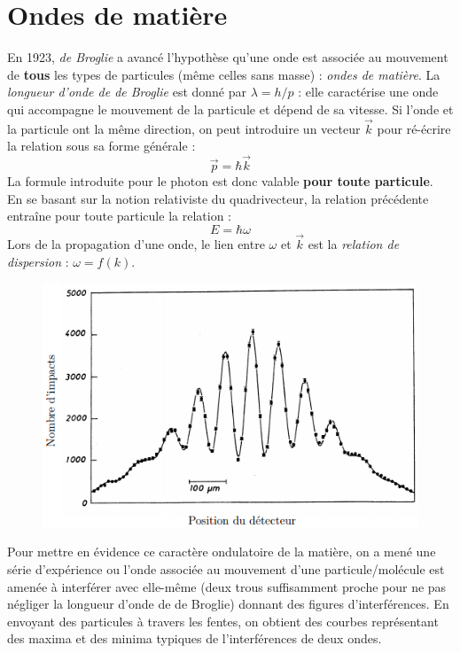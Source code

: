 \documentclass	[11pt, a4paper, openany]{book}
\begin{document}
\section{Ondes de matière}
En 1923, \textit{de Broglie} a avancé l'hypothèse qu'une onde est associée au mouvement de \textbf{tous} les types de particules (même celles sans masse) : \textit{ondes de matière}. La \textit{longueur d'onde de de Broglie} est donné par $\lambda = h/p$ : elle caractérise une onde qui accompagne le mouvement de la particule et dépend de sa vitesse. Si l'onde et la particule ont la même direction, on peut introduire un vecteur $\vec{k}$ pour ré-écrire la relation sous sa forme générale :
\begin{equation}
\vec p = \hbar \vec{k}
\end{equation}
La formule introduite pour le photon est donc valable \textbf{pour toute particule}.\\
En se basant sur la notion relativiste du quadrivecteur, la relation précédente entraîne pour toute particule la relation :
\begin{equation}
E = \hbar\omega
\end{equation}
Lors de la propagation d'une onde, le lien entre $\omega$ et $\vec{k}$ est la \textit{relation de dispersion} : $\omega = f(k)$.\\

\begin{figure}
\includegraphics[scale=0.3]{img/image3.png}
\end{figure}
Pour mettre en évidence ce caractère ondulatoire de la matière, on a mené une série d'expérience ou l'onde associée au mouvement d'une particule/molécule est amenée à interférer avec elle-même (deux trous suffisamment proche pour ne pas négliger la longueur d'onde de de Broglie) donnant des figures d'interférences. En envoyant des particules à travers les fentes, on obtient des courbes représentant des maxima et des minima typiques de l'interférences de deux ondes.\\
\end{document}
